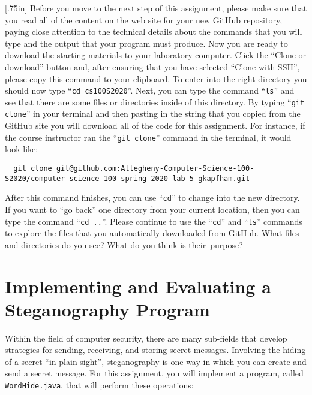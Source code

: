 \documentclass[11pt]{article}
\newcommand{\command}[1]{``\lstinline{#1}''}
\newcommand{\step}[1]{``{#1}''}
\newcommand{\caution}[1]{\null\hfill\LARGE{\faWarning{}}\newline\scriptsize{\em{#1}}}
\begin{document}
\marginnote{\caution{Clone GitHub repository}}[.75in] Before you move to the
next step of this assignment, please make sure that you read all of the content
on the web site for your new GitHub repository, paying close attention to the
technical details about the commands that you will type and the output that your
program must produce. Now you are ready to download the starting materials to
your laboratory computer. Click the ``Clone or download'' button and, after
ensuring that you have selected ``Clone with SSH'', please copy this command to
your clipboard. To enter into the right directory you should now type
\command{cd cs100S2020}. Next, you can type the command \command{ls} and see
that there are some files or directories inside of this directory. By typing
\command{git clone} in your terminal and then pasting in the string that you
copied from the GitHub site you will download all of the code for this
assignment. For instance, if the course instructor ran the \command{git clone}
command in the terminal, it would look like:

\begin{lstlisting}
  git clone git@github.com:Allegheny-Computer-Science-100-S2020/computer-science-100-spring-2020-lab-5-gkapfham.git
\end{lstlisting}

After this command finishes, you can use \command{cd} to change into the new
directory. If you want to \step{go back} one directory from your current
location, then you can type the command \command{cd ..}. Please continue to use
the \command{cd} and \command{ls} commands to explore the files that you
automatically downloaded from GitHub. What files and directories do you see?
What do you think is \mbox{their purpose}?


\section*{Implementing and Evaluating a Steganography Program}

Within the field of computer security, there are many sub-fields that develop
strategies for sending, receiving, and storing secret messages. Involving the
hiding of a secret ``in plain sight'', steganography is one way in which you can
create and send a secret message. For this assignment, you will implement a
program, called {\tt WordHide.java}, that will perform these operations:
\end{document}
